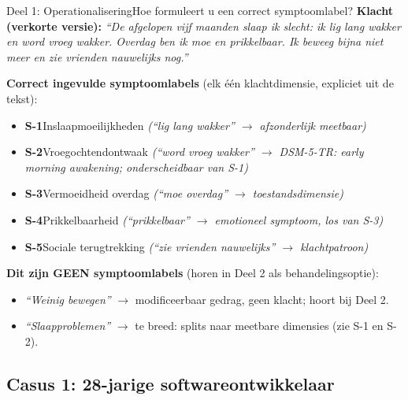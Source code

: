 \documentclass[11pt,a4paper]{article}
\begin{document}
\begin{voorbeeldbox}{Deel 1: Operationalisering}{Hoe formuleert u een correct symptoomlabel?}
\small
\textbf{Klacht (verkorte versie):} \textit{``De afgelopen vijf maanden slaap ik slecht:
ik lig lang wakker en word vroeg wakker. Overdag ben ik moe en prikkelbaar. Ik beweeg
bijna niet meer en zie vrienden nauwelijks nog.''}

\medskip
\textbf{Correct ingevulde symptoomlabels} (elk één klachtdimensie, expliciet uit de tekst):
\begin{itemize}[topsep=2pt,itemsep=1pt]
\item \textbf{S-1}\enspace Inslaapmoeilijkheden
  \hfill\textit{(``lig lang wakker'' $\rightarrow$ afzonderlijk meetbaar)}
\item \textbf{S-2}\enspace Vroegochtendontwaak
  \hfill\textit{(``word vroeg wakker'' $\rightarrow$ DSM-5-TR: early morning awakening; onderscheidbaar van S-1)}
\item \textbf{S-3}\enspace Vermoeidheid overdag
  \hfill\textit{(``moe overdag'' $\rightarrow$ toestandsdimensie)}
\item \textbf{S-4}\enspace Prikkelbaarheid
  \hfill\textit{(``prikkelbaar'' $\rightarrow$ emotioneel symptoom, los van S-3)}
\item \textbf{S-5}\enspace Sociale terugtrekking
  \hfill\textit{(``zie vrienden nauwelijks'' $\rightarrow$ klachtpatroon)}
\end{itemize}

\medskip
\textbf{\color{StrongRed}Dit zijn GEEN symptoomlabels} (horen in Deel 2 als behandelingsoptie):
\begin{itemize}[topsep=1pt,itemsep=0pt]
\item \textit{``Weinig bewegen''} $\rightarrow$ modificeerbaar gedrag, geen klacht; hoort bij Deel 2.
\item \textit{``Slaapproblemen''} $\rightarrow$ te breed: splits naar meetbare dimensies (zie S-1 en S-2).
\end{itemize}
\end{voorbeeldbox}

\vspace{0.5em}

\newpage

\subsection*{Casus 1: 28-jarige softwareontwikkelaar}
\end{document}
